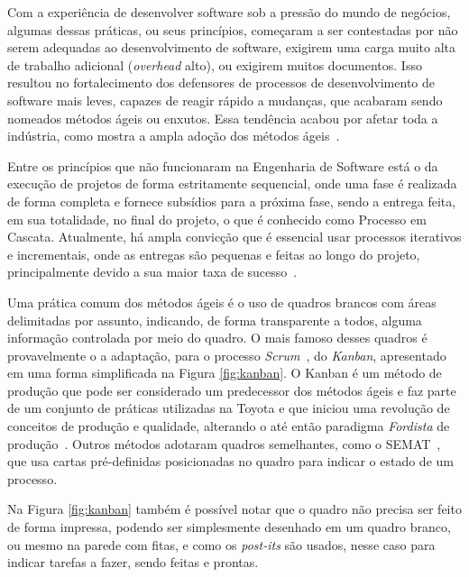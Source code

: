 \documentclass[a4]{report}
\begin{document}
Com a experiência de desenvolver software sob a pressão do mundo de negócios, algumas dessas práticas, ou seus princípios,  começaram a ser contestadas por não serem adequadas ao desenvolvimento de software, exigirem uma carga muito alta de trabalho adicional (\textit{overhead} alto), ou exigirem muitos documentos. Isso resultou no fortalecimento dos defensores de processos de desenvolvimento de software mais leves, capazes de reagir rápido a mudanças, que acabaram sendo nomeados métodos ágeis ou enxutos. Essa tendência acabou por afetar toda a indústria, como mostra a ampla adoção dos métodos ágeis~\citep{agilestate15}.

Entre os princípios que não funcionaram na Engenharia de Software está o da execução de projetos de forma estritamente sequencial, onde uma fase é realizada de forma completa e fornece subsídios para a próxima fase, sendo a entrega feita, em sua totalidade, no final do projeto, o que é conhecido como Processo em Cascata. Atualmente, há ampla convicção que é essencial usar processos iterativos e incrementais, onde as entregas são pequenas e feitas ao longo do projeto, principalmente devido a sua maior taxa de sucesso~\citep{pressman:2019,chaos:2015}.

Uma prática comum dos métodos ágeis é o uso de quadros brancos com áreas delimitadas por assunto, indicando, de forma transparente a todos, alguma informação controlada  por meio do quadro. O mais famoso desses quadros é provavelmente o a adaptação, para o processo \textit{Scrum}~\citep{scrum:sbok:guide}, do \textit{Kanban}, apresentado em uma forma simplificada na Figura \ref{fig:kanban}. O Kanban é um método de produção que pode ser considerado um predecessor dos métodos ágeis e faz  parte de um conjunto de práticas utilizadas na Toyota e que iniciou uma revolução de conceitos de produção e qualidade, alterando o até então paradigma \textit{Fordista} de produção~\citep{gross:2003:kanban}. Outros métodos adotaram quadros semelhantes, como o SEMAT~\citep{jacobson_essentials_2019}, que usa cartas pré-definidas posicionadas no quadro para indicar o estado de um processo.

Na Figura \ref{fig:kanban} também é possível notar que o quadro não precisa ser feito de forma impressa, podendo ser simplesmente desenhado em um quadro branco, ou mesmo na parede com fitas, e como os \textit{post-its} são usados, nesse caso para indicar tarefas a fazer, sendo feitas e prontas.
\end{document}
